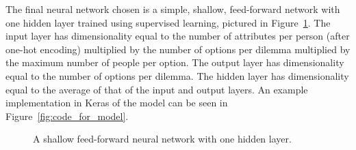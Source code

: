 \documentclass[]{report}
\begin{document}
The final neural network chosen is a simple, shallow, feed-forward network with one hidden layer
trained using supervised learning, pictured in Figure~\ref{fig:shallow_neural_network}. The input
layer has dimensionality equal to the number of attributes per person (after one-hot encoding)
multiplied by the number of options per dilemma multiplied by the maximum number of people per
option. The output layer has dimensionality equal to the number of options per dilemma. The hidden
layer has dimensionality equal to the average of that of the input and output layers. An example
implementation in Keras of the model can be seen in Figure~\ref{fig:code_for_model}.

\begin{figure}[h]
    \centering
    
    
    \caption[]{A shallow feed-forward neural network with one hidden layer.}
    \label{fig:shallow_neural_network}
\end{figure}
\end{document}
